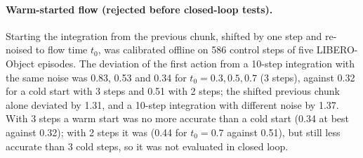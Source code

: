 \paragraph{Warm-started flow (rejected before closed-loop tests).}
Starting the integration from the previous chunk, shifted by one step and re-noised to flow time $t_0$, was calibrated offline on 586 control steps of five LIBERO-Object episodes.
The deviation of the first action from a 10-step integration with the same noise was 0.83, 0.53 and 0.34 for $t_0=0.3, 0.5, 0.7$ (3 steps), against 0.32 for a cold start with 3 steps and 0.51 with 2 steps; the shifted previous chunk alone deviated by 1.31, and a 10-step integration with different noise by 1.37.
With 3 steps a warm start was no more accurate than a cold start (0.34 at best against 0.32); with 2 steps it was (0.44 for $t_0=0.7$ against 0.51), but still less accurate than 3 cold steps, so it was not evaluated in closed loop.

